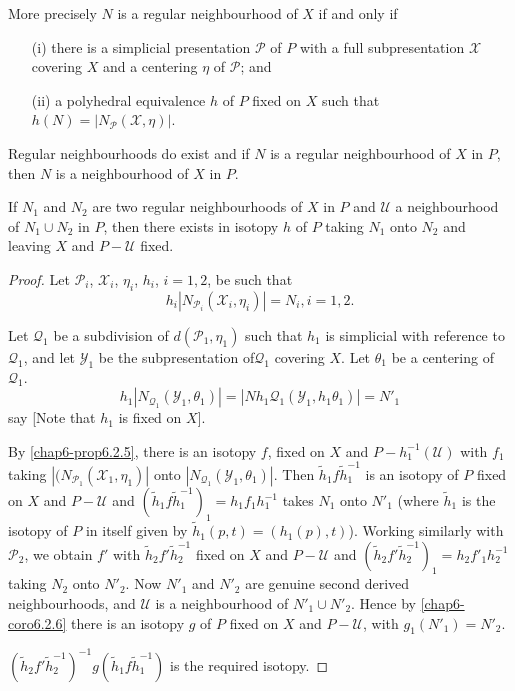 More precisely $N$ is a regular neighbourhood of $X$ if and only if
\begin{itemize}
\item[(i)] there is a simplicial presentation $\mathscr{P}$ of $P$ with a full subpresentation $\mathscr{X}$ covering $X$ and a centering $\eta$ of $\mathscr{P}$; and

\item[(ii)] a polyhedral equivalence $h$ of $P$ fixed on $X$ such that $h(N)=|N_{\mathscr{P}}(\mathscr{X},\eta)|$.
\end{itemize}

Regular neighbourhoods do exist and if $N$ is a regular neighbourhood of $X$ in $P$, then $N$ is a neighbourhood of $X$ in $P$.

\begin{proposition}\label{chap6-prop6.3.2}
If $N_{1}$ and $N_{2}$ are two regular neighbourhoods of $X$ in $P$ and $\mathscr{U}$ a neighbourhood of $N_{1}\cup N_{2}$ in $P$, then there exists in isotopy $h$ of $P$ taking $N_{1}$ onto $N_{2}$ and leaving $X$ and $P-\mathscr{U}$ fixed.
\end{proposition}

\begin{proof}
Let $\mathscr{P}_{i}$, $\mathscr{X}_{i}$, $\eta_{i}$, $h_{i}$, $i=1,2$, be such that
$$
h_{i}|N_{\mathscr{P}_{i}}(\mathscr{X}_{i},\eta_{i})|=N_{i},i=1,2.
$$

Let $\mathcal{Q}_{1}$ be a subdivision of $d(\mathscr{P}_{1},\eta_{1})$ such that $h_{1}$ is simplicial with reference to $\mathcal{Q}_{1}$, and let $\mathscr{Y}_{1}$ be the subpresentation of\pageoriginale $\mathcal{Q}_{1}$ covering $X$. Let $\theta_{1}$ be a centering of $\mathcal{Q}_{1}$. 
$$
h_{1}|N_{\mathcal{Q}_{1}}(\mathscr{Y}_{1},\theta_{1})|=|Nh_{1}\mathcal{Q}_{1}(\mathscr{Y}_{1},h_{1}\theta_{1})|=N'_{1}
$$
say [Note that $h_{1}$ is fixed on $X$].

By \ref{chap6-prop6.2.5}, there is an isotopy $f$, fixed on $X$ and $P-h^{-1}_{1}(\mathscr{U})$ with $f_{1}$ taking $|(N_{\mathscr{P}_{1}}(\mathscr{X}_{1},\eta_{1})|$ onto $|N_{\mathcal{Q}_{1}}(\mathscr{Y}_{1},\theta_{1})|$. Then $\tilde{h}_{1}f\tilde{h}^{-1}_{1}$ is an isotopy of $P$ fixed on $X$ and $P-\mathscr{U}$ and $(\tilde{h}_{1}f \tilde{h}^{-1}_{1})_{1}=h_{1}f_{1}h^{-1}_{1}$ takes $N_{1}$ onto $N'_{1}$ (where $\tilde{h}_{1}$ is the isotopy of $P$ in itself given by $\tilde{h}_{1}(p,t)=(h_{1}(p),t)$). Working similarly with $\mathscr{P}_{2}$, we obtain $f'$ with $\tilde{h}_{2}f'\tilde{h}^{-1}_{2}$ fixed on $X$ and $P-\mathscr{U}$ and $(\tilde{h}_{2}f'\tilde{h}^{-1}_{2})_{1}=h_{2}f'_{1}h^{-1}_{2}$ taking $N_{2}$ onto $N'_{2}$. Now $N'_{1}$ and $N'_{2}$ are genuine second derived neighbourhoods, and $\mathscr{U}$ is a neighbourhood
of $N'_{1}\cup N'_{2}$. Hence by \ref{chap6-coro6.2.6} there is an isotopy $g$ of $P$ fixed on $X$ and $P-\mathscr{U}$, with $g_{1}(N'_{1})=N'_{2}$.

$(\tilde{h}_{2}f'\tilde{h}_{2}^{-1})^{-1}g(\tilde{h}_{1}f\tilde{h}^{-1}_{1})$ is the required isotopy.
\end{proof}

